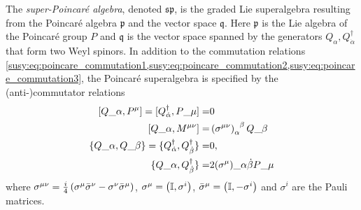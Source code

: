 \documentclass[../main.tex]{subfiles}
\begin{document}
The \emph{super-Poincaré algebra}, denoted \(\mathfrak{sp}\), is the graded Lie superalgebra resulting from the Poincaré algebra \(\mathfrak{p}\) and the vector space \(\mathfrak{q}\).
Here \(\mathfrak{p}\) is the Lie algebra of the Poincaré group \(P\) and \(\mathfrak{q}\) is the vector space spanned by the generators \(Q_\alpha, Q^\dagger_{\dot\alpha}\) that form two Weyl spinors.
In addition to the commutation relations \cref{susy:eq:poincare_commutation1,susy:eq:poincare_commutation2,susy:eq:poincare_commutation3}, the Poincaré superalgebra is specified by the (anti-)commutator relations
\begin{subequations}
  \begin{align}
    \commutator{Q\_\alpha}{P\^\mu} = \commutator{Q\indices*{^\dagger_{\dot\alpha}}}{P\_\mu} =               & 0                                                          \\
    \commutator{Q\_\alpha}{M\^{\mu\nu}} =                                                                   & \pclosed{\sigma\^{\mu\nu}}\indices{_\alpha^\beta} Q\_\beta \\
    \anticommutator{Q\_\alpha}{Q\_\beta} = \anticommutator{Q^\dagger_{\dot\alpha}}{Q^\dagger_{\dot\beta}} = & 0,                                                         \\
    \anticommutator{Q\_\alpha}{Q^\dagger_{\dot\beta}} =                                                     & 2(\sigma^\mu)\_{\alpha \dot\beta} P\_\mu
  \end{align}
\end{subequations}
where \(\sigma\^{\mu\nu} = \frac{i}{4}\pclosed{\sigma\^\mu \bar{\sigma}\^\nu - \sigma\^\nu \bar{\sigma}\^\mu}\), \(\sigma^\mu = \left(\operatorname{\mathbb{I}}, \sigma^i\right)\), \(\bar\sigma^\mu = \left(\operatorname{\mathbb{I}}, -\sigma^i\right)\) and \(\sigma^i\) are the Pauli matrices.
\end{document}
